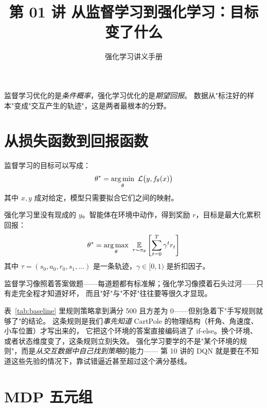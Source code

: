 \documentclass{rl-lecture}
\title{第 01 讲 \quad 从监督学习到强化学习：目标变了什么}
\author{强化学习讲义手册}
\date{}
\begin{document}
\maketitle

\begin{keypoint}[本讲结论]
监督学习优化的是\emph{条件概率}，强化学习优化的是\emph{期望回报}。
数据从"标注好的样本"变成"交互产生的轨迹"，这是两者最根本的分野。
\end{keypoint}

\section{从损失函数到回报函数}

监督学习的目标可以写成：
\begin{equation}
  \theta^* = \operatorname*{arg\,min}_{\theta}\ \mathcal{L}\big(y, f_\theta(x)\big)
\end{equation}
其中 $x, y$ 成对给定，模型只需要拟合它们之间的映射。

强化学习里没有现成的 $y$。智能体在环境中动作，得到奖励 $r$，目标是最大化累积回报：
\begin{equation}
  \theta^* = \operatorname*{arg\,max}_{\theta}\ \operatorname*{\mathbb{E}}_{\tau \sim \pi_\theta}\left[\sum_{t=0}^{T} \gamma^t r_t\right]
  \label{eq:rl-objective}
\end{equation}
其中 $\tau = (s_0, a_0, r_0, s_1, \ldots)$ 是一条轨迹，$\gamma \in [0,1)$ 是折扣因子。

\begin{intuition}
监督学习像照着答案做题——每道题都有标准解；强化学习像摸着石头过河——只有走完全程才知道好坏，
而且"好"与"不好"往往要等很久才显现。
\end{intuition}

\begin{pitfall}
表~\ref{tab:baseline} 里规则策略拿到满分 500 且方差为 0——但别急着下"手写规则就够了"的结论。
这条规则是我们\emph{事先知道} CartPole 的物理结构（杆角、角速度、小车位置）才写出来的，
它把这个环境的答案直接编码进了 if-else。换个环境、或者状态维度变了，这条规则立刻失效。
强化学习要学的不是"某个环境的规则"，而是\emph{从交互数据中自己找到策略}的能力——
第 10 讲的 DQN 就是要在不知道这些先验的情况下，靠试错逼近甚至超过这个满分基线。
\end{pitfall}

\section{MDP 五元组}
\end{document}
